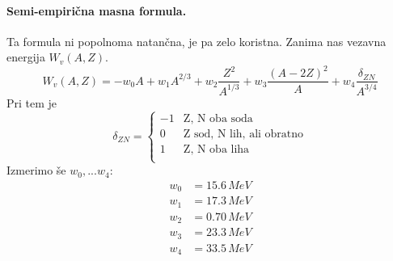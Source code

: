 \documentclass[a4paper]{article}
\begin{document}
\paragraph{Semi-empirična masna formula.} Ta formula ni popolnoma natančna, je pa zelo koristna. Zanima nas vezavna energija $W_v(A, Z)$.
$$W_v(A, Z) = -w_0A + w_1A^{2/3} + w_2\frac{Z^2}{A^{1/3}} + w_3\frac{(A-2Z)^2}{A} + w_4\frac{\delta_{ZN}}{A^{3/4}}$$
Pri tem je $$\delta_{ZN} = \begin{cases}
    -1 & \text{Z, N oba soda} \\
    0 & \text{Z sod, N lih, ali obratno} \\
    1 & \text{Z, N oba liha} \\
\end{cases}$$
Izmerimo še $w_0, ... w_4$:
\begin{align*}
    w_0 & = 15.6\,MeV \\
    w_1 & = 17.3\,MeV \\
    w_2 & = 0.70\,MeV \\
    w_3 & = 23.3\,MeV \\
    w_4 & = 33.5\,MeV \\
\end{align*}
\end{document}
